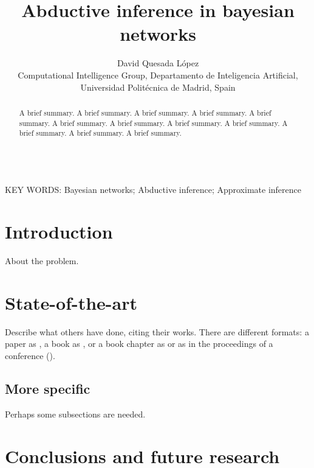 \documentclass[a4paper,11pt]{article}
\begin{document}
\title{Abductive inference in bayesian networks}

\author{{David Quesada López}\\
{\small Computational Intelligence Group, Departamento de Inteligencia Artificial, Universidad Polit\'ecnica de Madrid, Spain}}

\date{}
\maketitle



\begin{abstract} A brief summary. A brief summary. A brief summary. A brief summary. A brief summary. A brief summary. A brief summary. A brief summary. A brief summary. A brief summary. A brief summary. A brief summary.
\end{abstract}


\ \\
KEY WORDS: Bayesian networks; Abductive inference; Approximate inference




\section{Introduction}

About the problem.



\section{State-of-the-art}

Describe what others have done, citing their works. There are different formats: a paper as \cite{uncu2007}, a book as \cite{hosmer-lemeshow2000}, or a book chapter as \cite{wold75} or as in the proceedings of a conference (\cite{shakhnarovich2001icml}).

    \subsection{More specific}


Perhaps some subsections are needed.

\section{Conclusions and future research}
\end{document}
